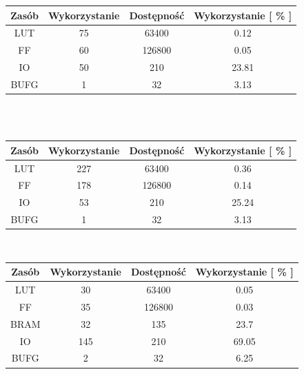 \documentclass[11pt,a4paper]{article}
\begin{document}
	\begin{minipage}[c]{\textwidth}
		 \begin{center}
				\begin{tabular}{|c|c|c|c|}
					\hline
					Zasób & Wykorzystanie & Dostępność & Wykorzystanie [ \% ] \\ 
					\hline
					LUT & 75 & 63400 & 0.12  \\
					\hline
					FF & 60 & 126800 & 0.05 \\
					\hline
					IO & 50 & 210 & 23.81 \\
					\hline
					BUFG & 1 & 32 & 3.13 \\
					\hline
				\end{tabular}
		\end{center}
\end{minipage}\\
\\

	\begin{minipage}[c]{\textwidth}
		 \begin{center}
				\begin{tabular}{|c|c|c|c|}
					\hline
					Zasób & Wykorzystanie & Dostępność & Wykorzystanie [ \% ] \\ 
					\hline
					LUT & 227 & 63400 & 0.36  \\
					\hline
					FF & 178 & 126800 & 0.14 \\
					\hline
					IO & 53 & 210 & 25.24 \\
					\hline
					BUFG & 1 & 32 & 3.13 \\
					\hline
				\end{tabular}
		\end{center}
\end{minipage}\\

	\begin{minipage}[c]{\textwidth}
		 \begin{center}
				\begin{tabular}{|c|c|c|c|}
					\hline
					Zasób & Wykorzystanie & Dostępność & Wykorzystanie [ \% ] \\ 
					\hline
					LUT & 30 & 63400 & 0.05  \\
					\hline
					FF & 35 & 126800 & 0.03 \\
					\hline
					BRAM & 32 & 135 & 23.7 \\
					\hline
					IO & 145 & 210 & 69.05 \\
					\hline
					BUFG & 2 & 32 & 6.25 \\
					\hline
				\end{tabular}
		\end{center}
\end{minipage}\\
\\
\end{document}
